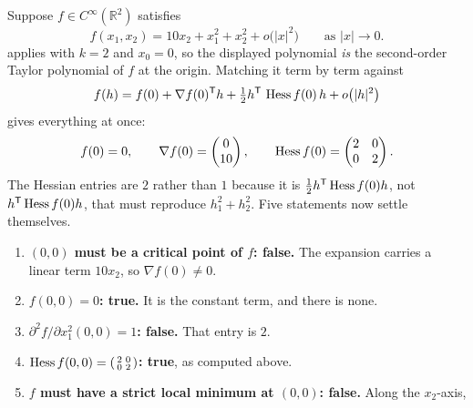 \begin{example}
\label{ex:expansion_five_verdicts}
Suppose $f \in C^\infty(\mathbb{R}^2)$ satisfies
\[f(x_1,x_2) = 10x_2 + x_1^2 + x_2^2 + o\big(\lvert x\rvert^2\big) \qquad
  \text{as } \lvert x\rvert \to 0 .\]
 applies with $k = 2$ and $x_0 = 0$, so the displayed polynomial
\emph{is} the second-order Taylor polynomial of $f$ at the origin. Matching it term by term
against
\[f(h) = f(0) + \nabla f(0)^{\mathsf{T}} h + \tfrac12 h^{\mathsf{T}}\, \operatorname{Hess} f(0)\, h + o\big(\lvert h\rvert^2\big)\]
gives everything at once:
\[f(0) = 0, \qquad \nabla f(0) = \begin{pmatrix} 0 \\ 10 \end{pmatrix}, \qquad
  \operatorname{Hess} f(0) = \begin{pmatrix} 2 & 0 \\ 0 & 2 \end{pmatrix}.\]
The Hessian entries are $2$ rather than $1$ because it is $\tfrac12 h^{\mathsf{T}} \operatorname{Hess} f(0)h$, not
$h^{\mathsf{T}} \operatorname{Hess} f(0)h$, that must reproduce $h_1^2 + h_2^2$. Five statements now settle
themselves.
\begin{enumerate}[label=\textbf{(\alph*)}]
  \item \textbf{$(0,0)$ must be a critical point of $f$: false.} The expansion carries a linear
    term $10x_2$, so $\nabla f(0) \neq 0$.
  \item \textbf{$f(0,0) = 0$: true.} It is the constant term, and there is none.
  \item \textbf{$\partial^2f/\partial x_1^2(0,0) = 1$: false.} That entry is $2$.
  \item \textbf{$\operatorname{Hess} f(0,0) = \left(\begin{smallmatrix} 2 & 0 \\ 0 & 2\end{smallmatrix}\right)$:
    true}, as computed above.
  \item \textbf{$f$ must have a strict local minimum at $(0,0)$: false.} Along the $x_2$-axis,

\end{enumerate}
\end{example}
